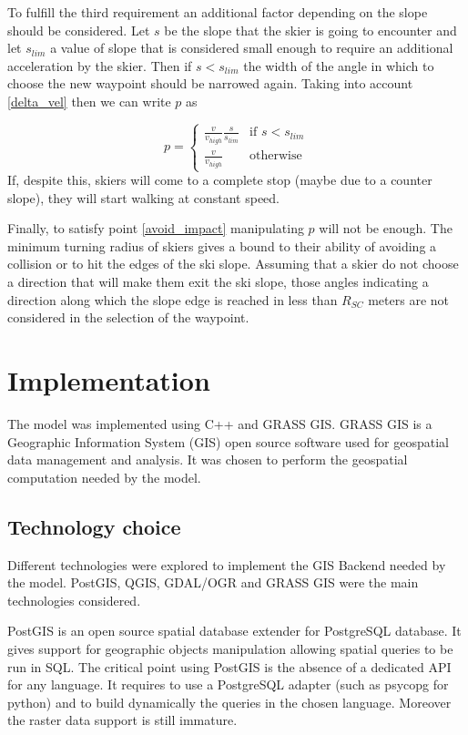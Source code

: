 \documentclass[12pt,a4paper,twoside]{book}
\begin{document}
To fulfill the third requirement an additional factor depending on the slope should be considered. Let $s$ be the slope that the skier is going to encounter and let $s_{lim}$ a value of slope that is considered small enough to require an additional acceleration by the skier. Then if $s<s_{lim}$ the width of the angle in which to choose the new waypoint should be narrowed again. Taking into account \ref{delta_vel} then we can write $p$ as

\begin{equation}
p=\begin{cases}
   \frac{v}{v_{high}}\frac{s}{s_{lim}} & \text{if } s < s_{lim} \\
   \frac{v}{v_{high}} & \text{otherwise}
\end{cases}
\end{equation}
If, despite this, skiers will come to a complete stop (maybe due to a counter slope), they will start walking at constant speed.

Finally, to satisfy point \ref{avoid_impact} manipulating $p$ will not be enough. The minimum turning radius of skiers gives a bound to their ability of avoiding a collision or to hit the edges of the ski slope. Assuming that a skier do not choose a direction that will make them exit the ski slope, those angles indicating a direction along which the slope edge is reached in less than $R_{SC}$ meters are not considered in the selection of the waypoint.

\chapter{Implementation}\label{implementation}
The model was implemented using C++ and GRASS GIS. GRASS GIS is a Geographic Information System (GIS) open source software used for geospatial data management and analysis. It was chosen to perform the geospatial computation needed by the model.

\section{Technology choice}
Different technologies were explored to implement the GIS Backend needed by the model. PostGIS, QGIS, GDAL/OGR and GRASS GIS were the main technologies considered.

PostGIS is an open source spatial database extender for PostgreSQL database. It gives support for geographic objects manipulation allowing spatial queries to be run in SQL. The critical point using PostGIS is the absence of a dedicated API for any language. It requires to use a PostgreSQL adapter (such as psycopg for python) and to build dynamically the queries in the chosen language. Moreover the raster data support is still immature.
\end{document}
